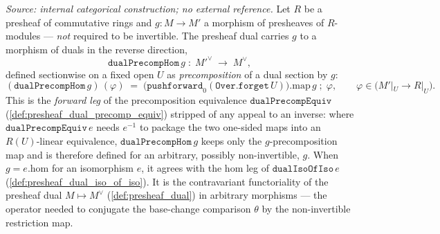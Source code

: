 \begin{definition}\leanok
  \label{def:presheaf_dual_precomp_hom}
  \textit{Source: internal categorical construction; no external reference.}
  Let \(R\) be a presheaf of commutative rings and \(g : M \to M'\) a morphism of presheaves of
  \(R\)-modules --- \emph{not} required to be invertible. The presheaf dual carries \(g\) to a
  morphism of duals in the reverse direction,
  \[
    \mathtt{dualPrecompHom}\,g \;\colon\; M'^\vee \;\longrightarrow\; M^\vee,
  \]
  defined sectionwise on a fixed open \(U\) as \emph{precomposition} of a dual section by \(g\):
  \[
    (\mathtt{dualPrecompHom}\,g)\,(\varphi) \;=\;
      \bigl(\mathtt{pushforward}_0(\mathtt{Over.forget}\,U)\bigr).\mathrm{map}\,g
        \;\mathbin{;}\; \varphi,
      \qquad \varphi \in \bigl(M'|_U \to R|_U\bigr).
  \]
  This is the \emph{forward leg} of the precomposition equivalence \(\mathtt{dualPrecompEquiv}\)
  (\cref{def:presheaf_dual_precomp_equiv}) stripped of any appeal to an inverse: where
  \(\mathtt{dualPrecompEquiv}\,e\) needs \(e^{-1}\) to package the two one-sided maps into an
  \(R(U)\)-linear equivalence, \(\mathtt{dualPrecompHom}\,g\) keeps only the \(g\)-precomposition map
  and is therefore defined for an arbitrary, possibly non-invertible, \(g\). When
  \(g = e.\mathrm{hom}\) for an isomorphism \(e\), it agrees with the \(\mathrm{hom}\) leg of
  \(\mathtt{dualIsoOfIso}\,e\) (\cref{def:presheaf_dual_iso_of_iso}). It is the contravariant
  functoriality of the presheaf dual \(M \mapsto M^\vee\) (\cref{def:presheaf_dual}) in arbitrary
  morphisms --- the operator needed to conjugate the base-change comparison \(\theta\) by the
  non-invertible restriction map.
\end{definition}

